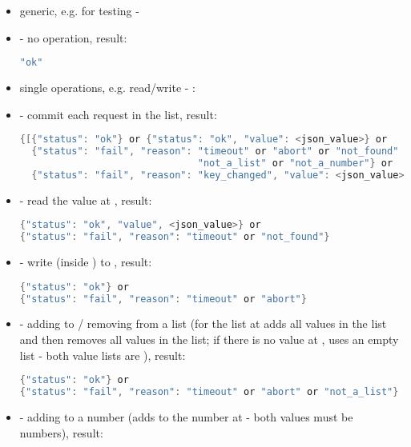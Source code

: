 \begin{itemize}
  \item[] \hspace{-1.7em}generic, e.g. for testing - 
  \item {} - no operation, result:
\begin{lstlisting}[language=java]
"ok"
\end{lstlisting}
  \item[] \hspace{-1.7em}single operations, e.g. read/write - :
  \item {} - commit each request in the list, result:
\begin{lstlisting}[language=java]
{[{"status": "ok"} or {"status": "ok", "value": <json_value>} or
  {"status": "fail", "reason": "timeout" or "abort" or "not_found" or
                               "not_a_list" or "not_a_number"} or
  {"status": "fail", "reason": "key_changed", "value": <json_value>}]}
\end{lstlisting}
  \item {} - read the value at , result:
\begin{lstlisting}[language=java]
{"status": "ok", "value", <json_value>} or
{"status": "fail", "reason": "timeout" or "not_found"}
\end{lstlisting}
  \item {} - write  (inside ) to , result:
\begin{lstlisting}[language=java]
{"status": "ok"} or
{"status": "fail", "reason": "timeout" or "abort"}
\end{lstlisting}
  \item {} - adding to / removing from a list
  (for the list at  adds all values in the  list and
  then removes all values in the  list; if there is no value at
  , uses an empty list - both value lists are \code{[<value>]}), result:
\begin{lstlisting}[language=java]
{"status": "ok"} or
{"status": "fail", "reason": "timeout" or "abort" or "not_a_list"}
\end{lstlisting}
  \item {} - adding to a number
  (adds  to the number at  - both values must be numbers), result:

\end{itemize}
